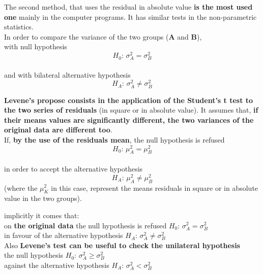 \begin{frame}
  \vspace*{.25cm}
  The second method, that uses the residual in absolute value \textbf{is the most used one} mainly in the computer programs. It has similar tests in the non-parametric statistics.\\
  \vspace*{.5cm}
  In order to compare the variance of the two groups (\textbf{A} and \textbf{B}),\\
  \vspace*{.25cm}
  with null hypothesis
  $$ H_0: \, \sigma^2_A = \sigma^2_B $$\\
  \vspace*{.5cm}
  and with bilateral alternative hypothesis
  $$ H_A: \, \sigma^2_A \neq \sigma^2_B $$
\end{frame}

\begin{frame}
  \vspace*{.25cm}
  \textbf{Levene's propose consists in the application of the Student's t test to the two series of residuals} (in square or in absolute value). It assumes that, \textbf{ if their means values are significantly different, the two variances of the original data are different too}.\\
  \vspace*{.5cm}
  If, \textbf{by the use of the residuals mean}, the null hypothesis is refused
  $$ H_0: \, \mu^2_A = \mu^2_B $$\\
  \vspace*{.25cm}
  in order to accept the alternative hypothesis
  $$ H_A: \, \mu^2_A \neq \mu^2_B $$
  (where the $ \mu^2_K $ in this case, represent the means residuals in square or in absolute value in the two groups).
\end{frame}

\begin{frame}
  \vspace*{.25cm}
  implicitly it comes that:\\
  \vspace*{.5cm}
  on \textbf{the original data} the null hypothesis is refused \hspace*{1.3cm} $ H_0: \, \sigma^2_A = \sigma^2_B $ \\
  \vspace*{.5cm}
  in favour of the alternative hypothesis \hspace*{2.6cm} $ H_A: \, \sigma^2_A \neq \sigma^2_B $\\
  \vspace*{1cm}
  Also \textbf{Levene's test can be useful to check the unilateral hypothesis}\\
  \vspace*{.25cm}
  the null hypothesis \hspace*{5.5cm} $ H_0: \, \sigma^2_A \geq \sigma^2_B $ \\	
  \vspace*{.5cm}
  against the alternative hypothesis \hspace*{3.4cm} $ H_A: \, \sigma^2_A < \sigma^2_B $\\
\end{frame}

